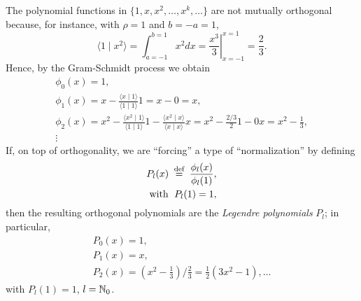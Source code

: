 The polynomial functions in $\{1,x,x^2,\ldots ,x^k,\ldots \}$
are not mutually orthogonal because,
for instance,  with $\rho =1$ and $b=-a=1$,
\begin{equation}
\langle   1 \mid x^2\rangle
=
\int_{a=-1}^{b=1} x^2 dx
=
\left. \frac{x^3}{3} \right|_{x=-1}^{x=1}
=
\frac{2}{3}.
\end{equation}
Hence, by the   Gram-Schmidt  process we obtain
\begin{equation}
\begin{split}
\phi_0(x) =1,       \\
\phi_1(x) = x - \frac{\langle x \mid 1 \rangle}{\langle 1   \mid 1 \rangle}1
= x - 0 =x,   \\
\phi_2(x) = x^2 - \frac{\langle x^2 \mid 1 \rangle}{\langle 1   \mid 1 \rangle}1
 - \frac{\langle x^2 \mid x \rangle}{\langle x   \mid x \rangle}x
=  x^2 - \frac{2/3}{2}1 -0x    =    x^2 - \frac{1 }{ 3},\\
\vdots  \qquad\qquad
\end{split}
\end{equation}
If, on top of orthogonality,  we are ``forcing'' a type of ``normalization'' by defining
\begin{equation}
\begin{split}
P_l(x)\stackrel{{\tiny \textrm{ def }}}{=}\frac{\phi_l(x)}{\phi_l(1)},
\\
 \textrm{with }\; P_l(1)  =1,
\end{split}
\end{equation}
then the resulting orthogonal polynomials are the
{\em Legendre polynomials}  $P_l$; in particular,
\begin{equation}
\begin{split}
P_0(x) =1,\\
P_1(x) =x,\\
P_2(x) =  \left. \left( x^2 - \frac{1 }{ 3}\right)\bigg/ \frac{2 }{ 3}  \right.
       =  \frac{1 }{ 2} \left( 3x^2 - 1\right)
,
\ldots
\end{split}
\label{2011-m-ch-sfelp}
\end{equation}
with $P_l(1)=1$, $l={\Bbb N}_0$.


